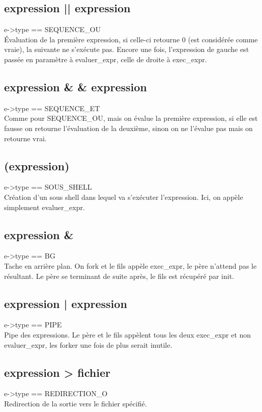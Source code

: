 \documentclass[12pt]{article}
\begin{document}
\subsection{expression || expression}
e->type == SEQUENCE\_OU\\
Évaluation de la première expression, si celle-ci retourne 0 (est considérée comme vraie),
la suivante ne s'exécute pas. Encore une fois, l'expression de gauche est passée en paramètre à evaluer\_expr,
celle de droite à exec\_expr.

\subsection{expression \& \& expression}
e->type == SEQUENCE\_ET\\
Comme pour SEQUENCE\_OU, mais on évalue la première expression,
si elle est fausse on retourne l'évaluation de la deuxième, sinon on ne l'évalue pas mais on retourne vrai.

\subsection{(expression)}
e->type == SOUS\_SHELL\\
Création d'un sous shell dans lequel va s'exécuter l'expression. Ici, on appèle simplement evaluer\_expr.

\subsection{expression \&}
e->type == BG\\
Tache en arrière plan. On fork et le fils appèle exec\_expr, le père n'attend pas le résultant.
Le père se terminant de suite après, le fils est récupéré par init.

\subsection{expression | expression}
e->type == PIPE\\
Pipe des expressions. Le père et le fils appèlent tous les deux exec\_expr et non evaluer\_expr,
les forker une fois de plus serait inutile.

\subsection{expression > fichier}
e->type == REDIRECTION\_O\\
Redirection de la sortie vers le fichier spécifié.
\end{document}
